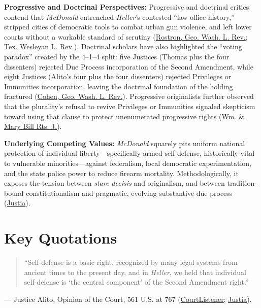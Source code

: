 \documentclass[12pt]{article}
\begin{document}
\textbf{Progressive and Doctrinal Perspectives:} Progressive and doctrinal critics contend that \textit{McDonald} entrenched \textit{Heller}'s contested ``law-office history,'' stripped cities of democratic tools to combat urban gun violence, and left lower courts without a workable standard of scrutiny (\href{https://irlaw.umkc.edu/faculty_works/671/}{Rostron, Geo. Wash. L. Rev.}; \href{https://scholarship.law.tamu.edu/context/txwes-lr/article/1481/viewcontent/10.37419_3ATWLR.V19.I3.3.pdf}{Tex. Wesleyan L. Rev.}). Doctrinal scholars have also highlighted the ``voting paradox'' created by the 4--1--4 split: five Justices (Thomas plus the four dissenters) rejected Due Process incorporation of the Second Amendment, while eight Justices (Alito's four plus the four dissenters) rejected Privileges or Immunities incorporation, leaving the doctrinal foundation of the holding fractured (\href{https://www.gwlr.org/wp-content/uploads/2012/08/79-3-Cohen.pdf}{Cohen, Geo. Wash. L. Rev.}). Progressive originalists further observed that the plurality's refusal to revive Privileges or Immunities signaled skepticism toward using that clause to protect unenumerated progressive rights (\href{https://scholarship.law.wm.edu/cgi/viewcontent.cgi?article=1567&context=wmborj}{Wm. \& Mary Bill Rts. J.}).

\textbf{Underlying Competing Values:} \textit{McDonald} squarely pits uniform national protection of individual liberty---specifically armed self-defense, historically vital to vulnerable minorities---against federalism, local democratic experimentation, and the state police power to reduce firearm mortality. Methodologically, it exposes the tension between \textit{stare decisis} and originalism, and between tradition-bound constitutionalism and pragmatic, evolving substantive due process (\href{https://supreme.justia.com/cases/federal/us/561/742/}{Justia}).

\section{Key Quotations}

\begin{quote}
``Self-defense is a basic right, recognized by many legal systems from ancient times to the present day, and in \textit{Heller}, we held that individual self-defense is `the central component' of the Second Amendment right.''
\end{quote}
--- Justice Alito, Opinion of the Court, 561 U.S. at 767 (\href{https://www.courtlistener.com/opinion/149702/mcdonald-v-city-of-chicago/}{CourtListener}; \href{https://supreme.justia.com/cases/federal/us/561/742/}{Justia}).
\end{document}
